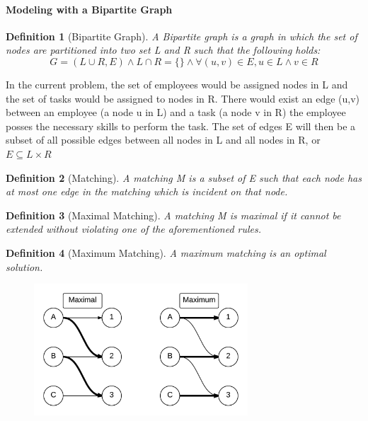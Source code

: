 \documentclass[12pt,letterpaper]{article}
\newtheorem{definition}{Definition}[section]
\begin{document}
\paragraph{Modeling with a Bipartite Graph}
\begin{definition}[Bipartite Graph]
A Bipartite graph is a graph in which the set of nodes are partitioned into two set L and R such that the following holds:\[G=(L\cup R,E)\wedge L\cap R=\{\}\wedge \forall(u,v)\in E, u\in L \wedge v\in R\]
\end{definition}  
In the current problem, the set of employees would be assigned nodes in L and the set of tasks would be assigned to nodes in R. There would exist an edge (u,v) between an employee (a node u in L) and a task (a node v in R) the employee posses the necessary skills to perform the task. The set of edges E will then be a subset of all possible edges between all nodes in L and all nodes in R, or $E\subseteq L\times R$
\begin{definition}[Matching]
A matching M is a subset of E such that each node has at most one edge in the matching which is incident on that node.
\end{definition}
\begin{definition}[Maximal Matching]
A matching M is maximal if it cannot be extended without violating one of the aforementioned rules.
\end{definition}
\begin{definition}[Maximum Matching]
A maximum matching is an optimal solution. 
\begin{figure}[h]
\centering
\includegraphics[width=8cm]{maximumvsmaximal}
\end{figure}
\end{definition}
\end{document}
